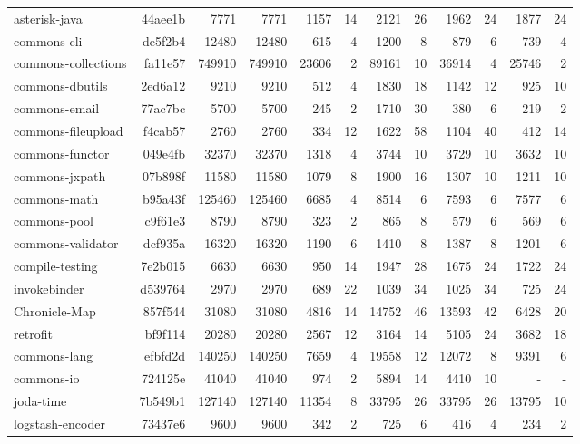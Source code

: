 \begin{landscape}
\begin{table*}[htbp]
{\begin{tabular}{|l|r|r|r|r|r|r|r|r|r|r|r|}
    
\multicolumn{1}{|l|}{asterisk-java}&	44aee1b	& 7771	& 7771	&1157	&14	&2121&	26	&1962&	24	&1877&	24 \\
\multicolumn{1}{|l|}{commons-cli}&	de5f2b4 &	12480&	12480&	615&	4	&1200&	8	&879&	6	&739&4 \\
\multicolumn{1}{|l|}{commons-collections}&	fa11e57	&749910&	749910	&23606	&2	&89161	&10	&36914&	4	&25746	&2\\
\multicolumn{1}{|l|}{commons-dbutils}&	2ed6a12	&9210&	9210&	512	&4	&1830	&18	&1142&	12	&925&	10 \\
\multicolumn{1}{|l|}{commons-email}&	77ac7bc	&5700	&5700	&245&	2&	1710	&30&	380	&6	&219	&2 \\
\multicolumn{1}{|l|}{commons-fileupload}&	f4cab57	&2760&	2760	&334&	12	&1622	&58	&1104	&40&	412	&14 \\
\multicolumn{1}{|l|}{commons-functor	}& 049e4fb &	32370&	32370	&1318&	4	&3744	&10	&3729	&10	&3632	&10 \\
\multicolumn{1}{|l|}{commons-jxpath}&	07b898f	&11580	&11580	&1079	&8	&1900&	16	&1307&	10	&1211	&10 \\
\multicolumn{1}{|l|}{commons-math}&	b95a43f	&125460	&125460	&6685	&4	&8514	&6	&7593	&6	&7577	&6 \\
\multicolumn{1}{|l|}{commons-pool}&	c9f61e3	&8790&	8790	&323&	2	&865	&8	& 579	&6	&569	&6 \\
\multicolumn{1}{|l|}{commons-validator}&	dcf935a	&16320	&16320	&1190	&6	&1410&	8	&1387&	8	&1201&	6 \\
\multicolumn{1}{|l|}{compile-testing}&	7e2b015	&6630	&6630	&950	&14	&1947&	28	&1675&	24	&1722	&24 \\
\multicolumn{1}{|l|}{invokebinder}&	d539764	&2970	&2970	&689	&22	&1039	&34	&1025	&34	&725	&24 \\
\multicolumn{1}{|l|}{Chronicle-Map}&	857f544	&31080	&31080	&4816	&14	&14752	&46	&13593	&42	&6428&	20 \\
\multicolumn{1}{|l|}{retrofit}&	bf9f114	& 20280	&20280	&2567	&12	&3164	&14	&5105	&24	&3682	&18 \\
\multicolumn{1}{|l|}{commons-lang}&	efbfd2d	&140250	&140250	&7659	&4&	19558	&12	&12072	&8	&9391	&6 \\
\multicolumn{1}{|l|}{commons-io}&	724125e	&41040	&41040	&974	&2	&5894	&14	&4410	&10	& -	& - \\
\multicolumn{1}{|l|}{joda-time}&	7b549b1	&127140	&127140	&11354	&8	&33795	&26	&33795	&26	&13795	&10 \\
\multicolumn{1}{|l|}{logstash-encoder}&	73437e6 &9600	&9600	&342	&2	&725	&6	&416&	4	&234&	2 \\

\end{tabular}}
\end{table*}
\end{landscape}
